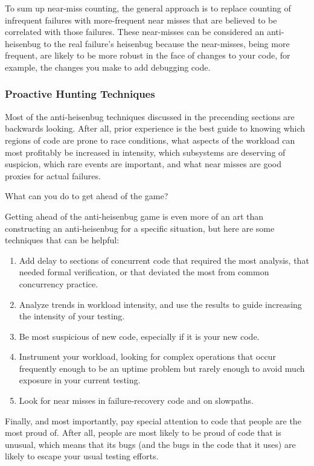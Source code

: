 To sum up near-miss counting, the general approach is to replace counting
of infrequent failures with more-frequent near misses that are believed
to be correlated with those failures.
These near-misses can be considered an anti-heisenbug to the real failure's
heisenbug because the near-misses, being more frequent, are likely to
be more robust in the face of changes to your code, for example, the
changes you make to add debugging code.

\subsubsection{Proactive Hunting Techniques}
\label{sec:debugging:Proactive Hunting Techniques}

Most of the anti-heisenbug techniques discussed in the precending sections
are backwards looking.
After all, prior experience is the best guide to knowing which regions
of code are prone to race conditions, what aspects of the workload
can most profitably be increased in intensity, which subsystems are
deserving of suspicion, which rare events are important, and what near
misses are good proxies for actual failures.

What can you do to get ahead of the game?

Getting ahead of the anti-heisenbug game is even more of an art than
constructing an anti-heisenbug for a specific situation, but here
are some techniques that can be helpful:

\begin{enumerate}
\item	Add delay to sections of concurrent code that required the
	most analysis, that needed formal verification, or that
	deviated the most from common concurrency practice.
\item	Analyze trends in workload intensity, and use the results to
	guide increasing the intensity of your testing.
\item	Be most suspicious of new code, especially if it is your new
	code.
\item	Instrument your workload, looking for complex operations that
	occur frequently enough to be an uptime problem but rarely
	enough to avoid much exposure in your current testing.
\item	Look for near misses in failure-recovery code and on slowpaths.
\end{enumerate}

Finally, and most importantly, pay special attention to code that people
are the most proud of.
After all, people are most likely to be proud of code that is unusual,
which means that its bugs (and the bugs in the code that it uses) are
likely to escape your usual testing efforts.

